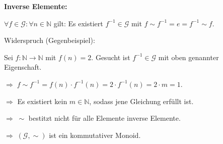 \begin{enumerate}
{{      \bigskip
      \textbf{Inverse Elemente:}

      $\forall f \in \mathcal{G}: \forall n \in \mathbb{N}$ gilt:
      Es existiert $f^{-1} \in \mathcal{G}$ mit $f \sim f^{-1} = e = f^{-1} \sim f$.

      Widerspruch (Gegenbeispiel):

      Sei $f: \mathbb{N} \to \mathbb{N}$ mit $f(n) = 2$.
      Gesucht ist $f^{-1} \in \mathcal{G}$ mit oben genannter Eigenschaft.

      $\Rightarrow\; f \sim f^{-1} = f(n) \cdot f^{-1}(n) = 2 \cdot f^{-1}(n) = 2 \cdot m = 1$.

      $\Rightarrow$ Es existiert kein $m \in \mathbb{N}$, sodass jene Gleichung
      erfüllt ist.

      $\Rightarrow \; \sim$ bestitzt nicht für alle Elemente inverse Elemente.

      \bigskip
      $\Rightarrow \; (\mathcal{G}, \sim)$ ist ein kommutativer Monoid.
    }{}
  }
\end{enumerate}